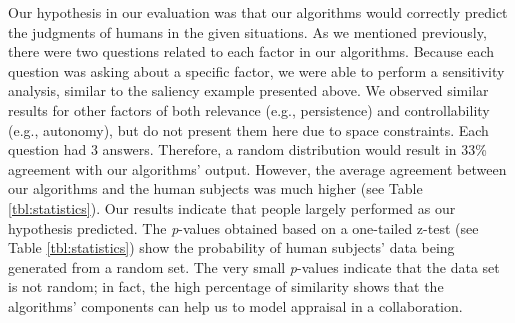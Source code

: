 \documentclass{article}
\begin{document}
% 

Our hypothesis in our evaluation was that our algorithms would correctly predict
the judgments of humans in the given situations. As we mentioned previously,
there were two questions related to each factor in our algorithms. Because
each question was asking about a specific factor, we were able to perform a
sensitivity analysis, similar to the saliency example presented above. We
observed similar results for other factors of both relevance (e.g., persistence)
and controllability (e.g., autonomy), but do not present them here due to space
constraints. Each question had 3 answers. Therefore, a random distribution would
result in 33\% agreement with our algorithms' output. However, the average
agreement between our algorithms and the human subjects was much higher (see
Table \ref{tbl:statistics}). Our results indicate that people largely performed
as our hypothesis predicted. The \textit{p}-values obtained based on a
one-tailed z-test (see Table \ref{tbl:statistics}) show the probability of human
subjects' data being generated from a random set. The very small
\textit{p}-values indicate that the data set is not random; in fact, the high
percentage of similarity shows that the algorithms' components can help us to
model appraisal in a collaboration.

\vspace{-2mm}
\end{document}
